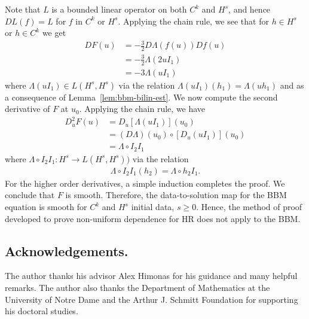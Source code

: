 Note that $L$ is a bounded linear operator on both $C^{k}$ and $H^{s}$, and
hence $DL(f) = L$ for $f$ in $C^{k}$ or $H^{s}$. Applying the chain rule, we see that for $h \in H^{s}$ or $h \in C^{k}$
we get
%
%
\begin{equation*}
\begin{split}
DF(u) & = -\frac{3}{2}D \Lambda (f(u))Df(u)\\
& = -\frac{3}{2} \Lambda (2uI_{1})
\\
& = -3 \Lambda (uI_{1})
\end{split}
\end{equation*}
%
%
where $\Lambda (uI_{1}) \in L(H^{s}, H^{s})$ via the relation
$\Lambda (uI_{1})(h_{1}) = \Lambda (u h_{1})$ and as a consequence of 
Lemma~\ref{lem:bbm-bilin-est}. 
%
We now compute the second derivative of $F$ at $u_{0}$. Applying the chain rule, we have
%
%
\begin{equation*}
\begin{split}
    D^{2}_{u}F(u) 
    & = D_{u} \left[ \Lambda (u I_{1}) \right](u_{0})
    \\
    & = (D \Lambda)(u_{0}) \circ \left[ D_{u}(u I_{1}) \right](u_{0})
    \\
    & = \Lambda \circ I_{2}I_{1}
\end{split}
\end{equation*}
%
%
where $\Lambda \circ I_{2} I_{1}: H^{s} \to L(H^{s}, H^{s}))$ via the
relation
%
%
\begin{equation*}
\begin{split}
    \Lambda \circ I_{2} I_{1} (h_{2}) = \Lambda \circ h_{2} I_{1}.
\end{split}
\end{equation*}
%
%
For the higher order derivatives, a simple induction completes the proof.
We conclude that $F$ is smooth. Therefore, the
data-to-solution map for the BBM equation is smooth for $C^{k}$ and $H^{s}$
initial data, $s \ge 0$. Hence, the method of proof developed to prove
non-uniform dependence for HR does not apply to the BBM.
\subsection*{Acknowledgements.} The author thanks his advisor Alex Himonas for 
his guidance and many helpful remarks. The author also thanks the Department of 
Mathematics at the University of Notre Dame and the Arthur J. Schmitt Foundation for 
supporting his doctoral 
studies.
%
%
%
